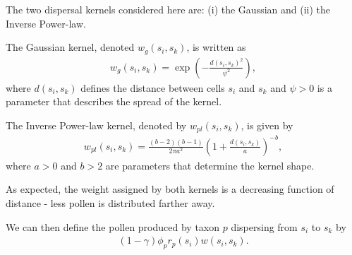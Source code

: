 \documentclass[12pt]{article}
\begin{document}
The two dispersal kernels considered here are: (i) the Gaussian and
(ii) the Inverse Power-law.

The Gaussian kernel, denoted $w_g(s_i,s_k)$, is written as
\begin{align}
w_g(s_i, s_k) = \exp\left( - \frac{d(s_i, s_k)^2}{\psi^2} \right),
\end{align}
where $d(s_i,s_k)$ defines the distance between cells $s_i$ and $s_k$
and $\psi>0$ is a parameter that describes the spread of the kernel. 

The Inverse Power-law kernel, denoted by $w_{pl}(s_i,s_k)$, is given by
\begin{align}
w_{pl}(s_i, s_k) = \frac{(b-2)(b-1)}{2 \pi a^2} \left( 1 + \frac{d(s_i, s_k)}{a} \right)^{-b},
\end{align}
where $a>0$ and $b>2$ are parameters that determine the kernel shape. 

As expected, the weight assigned by both kernels is a decreasing function
of distance - less pollen is distributed farther away.

 
We can then define the pollen produced by taxon $p$ dispersing from
$s_i$ to $s_k$ by
\begin{align}
(1-\gamma) \phi_p r_p(s_i) w(s_i, s_k).
\end{align}



\end{document}
